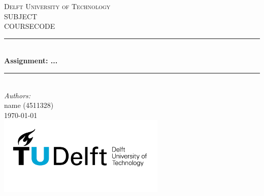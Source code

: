 \documentclass[a4paper]{article}
\begin{document}

\begin{titlepage}

\newcommand{\HRule}{\rule{\linewidth}{0.5mm}} 							%
\center 
 
\textsc{\LARGE Delft University of Technology}\\[1cm]

\textsc{\Large SUBJECT}\\[0.2cm]
\textsc{\large COURSECODE}\\[1cm] 										%
\HRule \\[0.8cm]
{ \huge \bfseries Assignment: ...}\\[0.7cm]								%
\HRule \\[2cm]
\large
\emph{Authors:}\\
name (4511328)\\[1.5cm]													%
{\large \today}\\[5cm]
\includegraphics[width=0.6\textwidth]{images/TU_delft_logo.jpg}\\[1cm] 	%
\vfill 
\end{titlepage}

\end{document}
